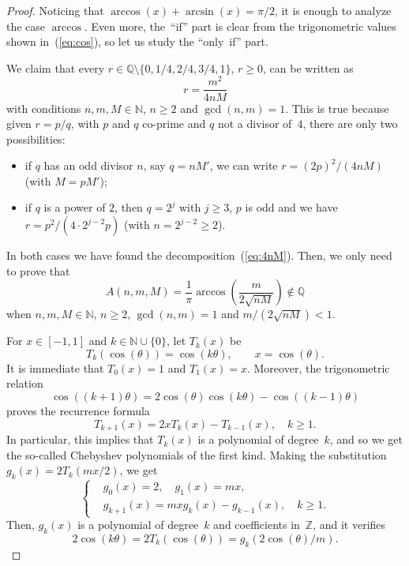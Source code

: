\documentclass[10pt,a4paper]{article}
\newcommand{\Q}{\mathbb{Q}}
\newcommand{\Z}{\mathbb{Z}}
\newcommand{\N}{\mathbb{N}}
\theoremstyle{remark}
\begin{document}
\begin{proof}
Noticing that $\arccos(x) + \arcsin(x) = \pi/2$, it is enough to analyze
the case $\arccos$. Even more, the~``if'' part is clear from the trigonometric
values shown in~(\ref{eq:cos}), so let us study the ``only~if'' part.

We claim that every $r \in \Q \setminus \{0, 1/4, 2/4, 3/4, 1 \}$, $r \ge 0$,
can be written as
\begin{equation}
\label{eq:4nM}
  r = \frac{m^2}{4nM}
\end{equation}
with conditions $n,m,M \in \N$, $n \ge 2$ and $\gcd(n,m) = 1$.
This is true because given $r = p/q$, with $p$ and $q$ co-prime
and $q$ not a divisor of~$4$, there are only two possibilities:
\begin{itemize}
\item if $q$ has an odd divisor $n$, say $q = nM'$, we can write
$r = (2p)^2/(4nM)$ (with $M=pM'$);
\item if $q$ is a power of $2$, then $q = 2^j$ with $j \ge 3$,
$p$ is odd and we have $r = p^2/(4\cdot2^{j-2}p)$ (with $n = 2^{j-2} \ge 2$).
\end{itemize}
In both cases we have found the decomposition~(\ref{eq:4nM}).
Then, we only need to prove that
\begin{equation*}
\label{eq:nmM}
  A(n,m,M) = \frac{1}{\pi} \arccos\left(\frac{m}{2\sqrt{nM}}\right) \notin \Q
\end{equation*}
when $n,m,M \in \N$, $n \ge 2$, $\gcd(n,m) = 1$ and $m/(2\sqrt{nM}) < 1$.

For $x \in [-1,1]$ and $k \in \N \cup \{0\}$, let $T_k(x)$ be
$$
  T_k(\cos(\theta)) = \cos(k \theta), \qquad x = \cos(\theta).
$$
It is immediate that $T_0(x) = 1$ and $T_1(x) = x$. Moreover, the trigonometric relation
\begin{equation*}
  \cos((k+1)\theta) = 2\cos(\theta)\cos(k\theta) - \cos((k-1)\theta)
\end{equation*}
proves the recurrence formula
\begin{equation*}
  T_{k+1}(x) = 2x T_k(x) - T_{k-1}(x), \quad k \ge 1.
\end{equation*}
In particular, this implies that $T_k(x)$ is a polynomial of degree~$k$,
and so we get the so-called Chebyshev polynomials of the first kind.
Making the substitution $g_k(x) = 2T_k(mx/2)$, we get
\begin{equation}
\label{eq:g_k}
\left\{
\begin{aligned}
  &g_0(x) = 2,\quad g_1(x) = m x,\\
  &g_{k+1}(x) = m x g_k(x) - g_{k-1}(x), \quad k \ge 1.
\end{aligned}
\right.
\end{equation}
Then, $g_k(x)$ is a polynomial of degree~$k$ and coefficients in~$\Z$,
and it verifies
\begin{equation}
\label{eq:2cosg}
  2 \cos(k \theta) = 2 T_k(\cos(\theta))
  = g_k(2\cos(\theta)/m).
\end{equation}


\end{proof}
\end{document}
